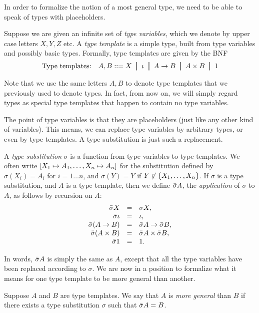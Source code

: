 \documentclass{article}
\begin{document}
In order to formalize the notion of a most general type, we need to be
able to speak of types with placeholders. 

\begin{definition}
  Suppose we are given an
  infinite set of {\em type variables}, which we denote by upper case
  letters $X,Y,Z$ etc. A {\em type template} is a simple type, built
  from type variables and possibly basic types. Formally, type templates
  are given by the BNF
  \[ \mbox{Type templates:}\ssep A,B \bnf X \bor \iota \bor A\to B\bor 
  A\times B\bor 1
  \]
\end{definition}

Note that we use the same letters $A,B$ to denote type templates that
we previously used to denote types. In fact, from now on, we will
simply regard types as special type templates that happen to contain
no type variables.

The point of type variables is that they are placeholders (just like
any other kind of variables). This means, we can replace type
variables by arbitrary types, or even by type templates. A type
substitution is just such a replacement.

\begin{definition}
  A {\em type substitution} $\sigma$ is a function from type variables
  to type templates. We often write $[X_1\mapsto A_1,\ldots,X_n\mapsto
  A_n]$ for the substitution defined by $\sigma(X_i)=A_i$ for
  $i=1\ldots n$, and $\sigma(Y)=Y$ if $Y\not\in\{X_1,\ldots,X_n\}$. 
  If $\sigma$ is a type substitution, and $A$ is a type template, then
  we define $\bar{\sigma} A$, the {\em application} of $\sigma$ to $A$,
  as follows by recursion on $A$:
  \[ \begin{array}{rcl}
    \bar{\sigma} X &=& \sigma X, \\
    \bar{\sigma} \iota &=& \iota, \\
    \bar{\sigma} (A\to B) &=& \bar{\sigma} A \to \bar{\sigma} B, \\
    \bar{\sigma} (A\times B) &=& \bar{\sigma} A \times \bar{\sigma} B, \\
    \bar{\sigma} 1 &=& 1.
  \end{array}
  \]
\end{definition}

In words, $\bar{\sigma} A$ is simply the same as $A$, except that all the
type variables have been replaced according to $\sigma$. We are now in
a position to formalize what it means for one type template to be more
general than another.

\begin{definition}
  Suppose $A$ and $B$ are type templates. We say that $A$ is {\em more
    general} than $B$ if there exists a type substitution $\sigma$
  such that $\bar{\sigma} A=B$.
\end{definition}
\end{document}
